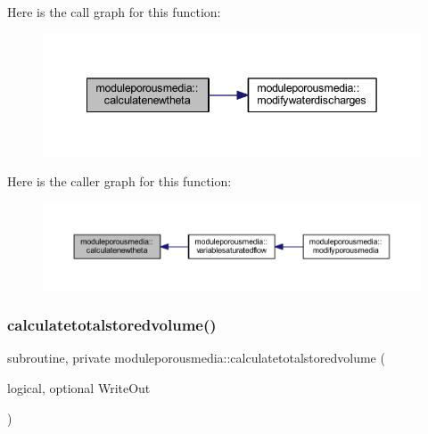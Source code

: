 Here is the call graph for this function\+:\nopagebreak
\begin{figure}[H]
\begin{center}
\leavevmode
\includegraphics[width=342pt]{namespacemoduleporousmedia_a659c3fab21d457aee320269fbc101787_cgraph}
\end{center}
\end{figure}
Here is the caller graph for this function\+:\nopagebreak
\begin{figure}[H]
\begin{center}
\leavevmode
\includegraphics[width=350pt]{namespacemoduleporousmedia_a659c3fab21d457aee320269fbc101787_icgraph}
\end{center}
\end{figure}
\mbox{\label{namespacemoduleporousmedia_a445b7f7d63644c6c7b90d76b56175868}} 
\subsubsection{\texorpdfstring{calculatetotalstoredvolume()}{calculatetotalstoredvolume()}}
{\footnotesize\ttfamily subroutine, private moduleporousmedia\+::calculatetotalstoredvolume (\begin{DoxyParamCaption}\item[{logical, optional}]{Write\+Out }\end{DoxyParamCaption})\hspace{0.3cm}{\ttfamily [private]}}


